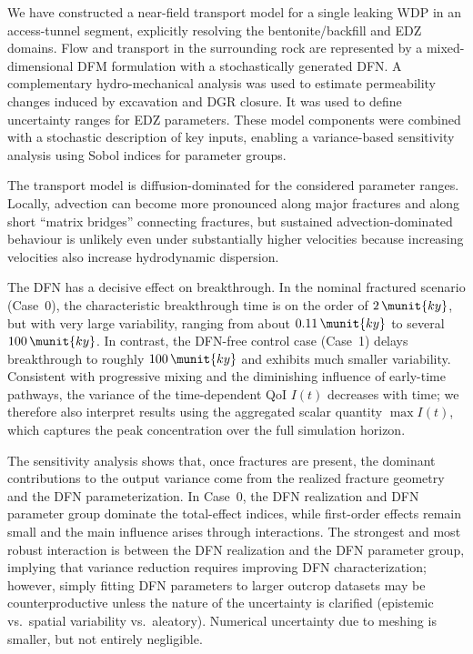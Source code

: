 We have constructed a near-field transport model for a single leaking \gls{WDP} in an access-tunnel segment, explicitly resolving the bentonite/backfill and EDZ domains. Flow and transport in the surrounding rock are represented by a mixed-dimensional \gls{DFM} formulation with a stochastically generated \gls{DFN}. A complementary hydro-mechanical analysis was used to estimate permeability changes induced  by excavation and \gls{DGR} closure. It was used to define uncertainty ranges for EDZ parameters. These model components were combined with a stochastic description of key inputs, enabling a variance-based sensitivity analysis using Sobol indices for parameter groups.

The transport model is diffusion-dominated for the considered parameter ranges. Locally, advection can become more pronounced along major fractures and along short ``matrix bridges'' connecting fractures, but sustained advection-dominated behaviour is unlikely even under substantially higher velocities because increasing velocities also increase hydrodynamic dispersion.



The DFN has a decisive effect on breakthrough. In the nominal fractured scenario (Case~0), the characteristic breakthrough time is on the order of $2\,\munit{ky}$, but with very large variability, ranging from about $0.11\,\munit{ky}$ to several $100\,\munit{ky}$. In contrast, the DFN-free control case (Case~1) delays breakthrough to roughly $100\,\munit{ky}$ and exhibits much smaller variability. Consistent with progressive mixing and the diminishing influence of early-time pathways, the variance of the time-dependent \gls{QoI} $I(t)$ decreases with time; we therefore also interpret results using the aggregated scalar quantity $\max I(t)$, which captures the peak concentration over the full simulation horizon.

The sensitivity analysis shows that, once fractures are present, the dominant contributions to the output variance come from the realized fracture geometry and the DFN parameterization. In Case~0, the DFN realization and DFN parameter group dominate the total-effect indices, while first-order effects remain small and the main influence arises through interactions. The strongest and most robust interaction is between the DFN realization and the DFN parameter group, implying that variance reduction requires improving DFN characterization; however, simply fitting DFN parameters to larger outcrop datasets may be counterproductive unless the nature of the uncertainty is clarified (epistemic vs.\ spatial variability vs.\ aleatory). Numerical uncertainty due to meshing is smaller, but not entirely negligible.

